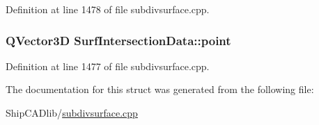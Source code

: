 Definition at line 1478 of file subdivsurface.\-cpp.

\hypertarget{structSurfIntersectionData_a789d1758e7035fdf5b902861e936113a}{
\subsubsection[{point}]{\setlength{\rightskip}{0pt plus 5cm}Q\-Vector3\-D Surf\-Intersection\-Data\-::point}}\label{structSurfIntersectionData_a789d1758e7035fdf5b902861e936113a}


Definition at line 1477 of file subdivsurface.\-cpp.



The documentation for this struct was generated from the following file\-:\begin{DoxyCompactItemize}
\item 
Ship\-C\-A\-Dlib/\hyperlink{subdivsurface_8cpp}{subdivsurface.\-cpp}\end{DoxyCompactItemize}
